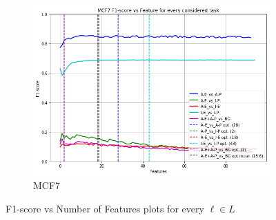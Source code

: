 \begin{figure}[!htb]
    \begin{subfigure}[b]{0.48\textwidth}
        \includegraphics[width=\textwidth]{images/features_plots/MCF7_feature_plot.png}
        \caption{MCF7}
        \label{fig:MCF7_n_feat}
    \end{subfigure}
    \caption{F1-score vs Number of Features plots for every $\ell \in L$}\label{fig:feats_plot}
\end{figure}

